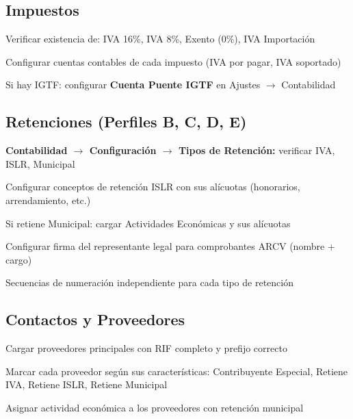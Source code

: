 \documentclass[11pt,a4paper]{article}
\begin{document}
\begin{Form}
\subsection{Impuestos}

\begin{checklist}
  \item Verificar existencia de: IVA 16\%, IVA 8\%, Exento (0\%), IVA Importación
  \item Configurar cuentas contables de cada impuesto (IVA por pagar, IVA soportado)
  \item Si hay IGTF: configurar \textbf{Cuenta Puente IGTF} en Ajustes $\rightarrow$ Contabilidad
\end{checklist}

\subsection{Retenciones (Perfiles B, C, D, E)}

\begin{checklist}
  \item \textbf{Contabilidad $\rightarrow$ Configuración $\rightarrow$ Tipos de Retención:} verificar IVA, ISLR, Municipal
  \item Configurar conceptos de retención ISLR con sus alícuotas (honorarios, arrendamiento, etc.)
  \item Si retiene Municipal: cargar Actividades Económicas y sus alícuotas
  \item Configurar firma del representante legal para comprobantes ARCV (nombre + cargo)
  \item Secuencias de numeración independiente para cada tipo de retención
\end{checklist}

\subsection{Contactos y Proveedores}

\begin{checklist}
  \item Cargar proveedores principales con RIF completo y prefijo correcto
  \item Marcar cada proveedor según sus características: Contribuyente Especial, Retiene IVA, Retiene ISLR, Retiene Municipal
  \item Asignar actividad económica a los proveedores con retención municipal
\end{checklist}


\end{Form}
\end{document}
